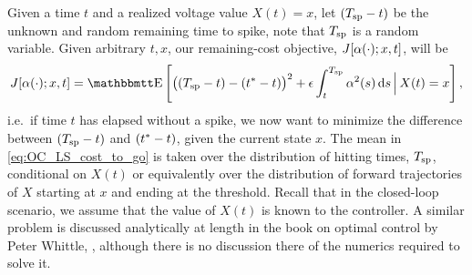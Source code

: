 \documentclass[12pt]{iopart}
\begin{document}
Given a time $t$ and a realized voltage value $X(t) = x$, let $({ T_{\textrm{sp} } }-t)$ be the
unknown and random remaining time to spike, note that ${ T_{\textrm{sp} } }$ is a random
variable. Given arbitrary $t, x$, our remaining-cost objective, $J[{\alpha}(\cdot);
x,t]$, will be
\begin{equation}
J[\a(\cdot); x,t]  =
\Exp\left[
\big((\ts-t) - (\T-t) \big)^2  
+
\e \int_t^\ts  \a^2(s) \intd{s} 
\,\Big|\, X(t) = x
\right],
\label{eq:OC_LS_cost_to_go}
\end{equation}
i.e.\ if time $t$ has elapsed without a spike, we now want to minimize
the difference between $({ T_{\textrm{sp} } } - t)$ and $({ t^* }-t)$, given the current state $x$.
The mean in \cref{eq:OC_LS_cost_to_go} is taken over the distribution of
hitting times, ${ T_{\textrm{sp} } }$, conditional on $X(t)$ or equivalently over the
distribution of forward trajectories of $X$ starting at $x$ and ending at the
threshold. 
Recall that in the closed-loop scenario, we assume that
the value of $X(t)$ is known to the controller. A similar problem is discussed
analytically at length in the book on optimal control by Peter Whittle,
\cite{Whittle1996}, although there is no discussion there of the numerics
required to solve it. 
\end{document}
